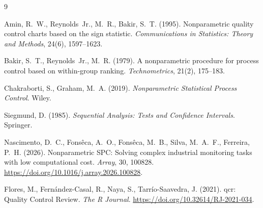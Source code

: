\documentclass[11pt,a4paper]{article}
\begin{document}
\begin{thebibliography}{9}

Amin, R.~W., Reynolds~Jr., M.~R., Bakir, S.~T. (1995).
Nonparametric quality control charts based on the sign statistic.
\emph{Communications in Statistics: Theory and Methods}, 24(6), 1597--1623.

Bakir, S.~T., Reynolds~Jr., M.~R. (1979).
A nonparametric procedure for process control based on within-group ranking.
\emph{Technometrics}, 21(2), 175--183.

Chakraborti, S., Graham, M.~A. (2019).
\emph{Nonparametric Statistical Process Control}. Wiley.

Siegmund, D. (1985).
\emph{Sequential Analysis: Tests and Confidence Intervals}. Springer.

Nascimento, D.~C., Fons\^eca, A.~O., Fons\^eca, M.~B., Silva, M.~A.~F.,
Ferreira, P.~H. (2026).
Nonparametric SPC: Solving complex industrial monitoring tasks with low
computational cost. \emph{Array}, 30, 100828.
\url{https://doi.org/10.1016/j.array.2026.100828}.

Flores, M., Fern\'andez-Casal, R., Naya, S., Tarr\'io-Saavedra, J. (2021).
qcr: Quality Control Review. \emph{The R Journal}.
\url{https://doi.org/10.32614/RJ-2021-034}.

\end{thebibliography}
\end{document}
